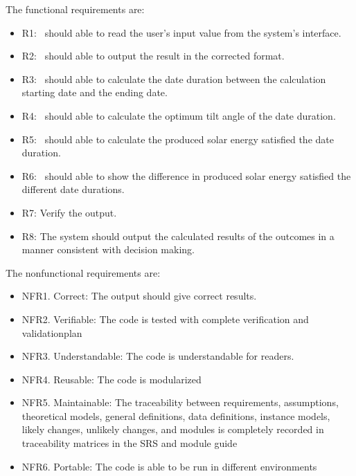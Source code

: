 \documentclass[12pt, titlepage]{article}
\begin{document}
The functional requirements are:
\begin{itemize} 
\item[ ]R1: \progname~should able to read the user's input value from the
system's interface. \item[ ]R2: \progname~should able to output the result in
the corrected format.
\item[ ]R3: \progname~should able to calculate the date duration between the
calculation starting date and the ending date.
\item[ ]R4: \progname~should able to calculate the optimum tilt angle of the
date duration.
\item[ ]R5: \progname~should able to calculate the produced solar energy
satisfied the date duration.
\item[ ]R6: \progname~should able to show the difference in produced solar
energy satisfied the different date durations.
\item[ ]R7: Verify the output. \item[ ]R8: The system should output the
calculated results of the outcomes in a manner consistent with decision making.
 \end{itemize}

The nonfunctional requirements are: 
\begin{itemize} 
\item[ ]NFR1. Correct: The output should give correct results.
\item[ ]NFR2. Verifiable: The code is tested with complete verification and
validationplan
\item[ ]NFR3. Understandable: The code is understandable for readers. 
\item[ ]NFR4. Reusable: The code is modularized
\item[ ]NFR5. Maintainable: The traceability between requirements, assumptions,
theoretical models, general definitions, data definitions, instance models,
likely changes, unlikely changes, and modules is completely recorded in
traceability matrices in the SRS and module guide
\item[ ]NFR6. Portable: The code is able to be run in different environments 
\end{itemize}

\end{document}
